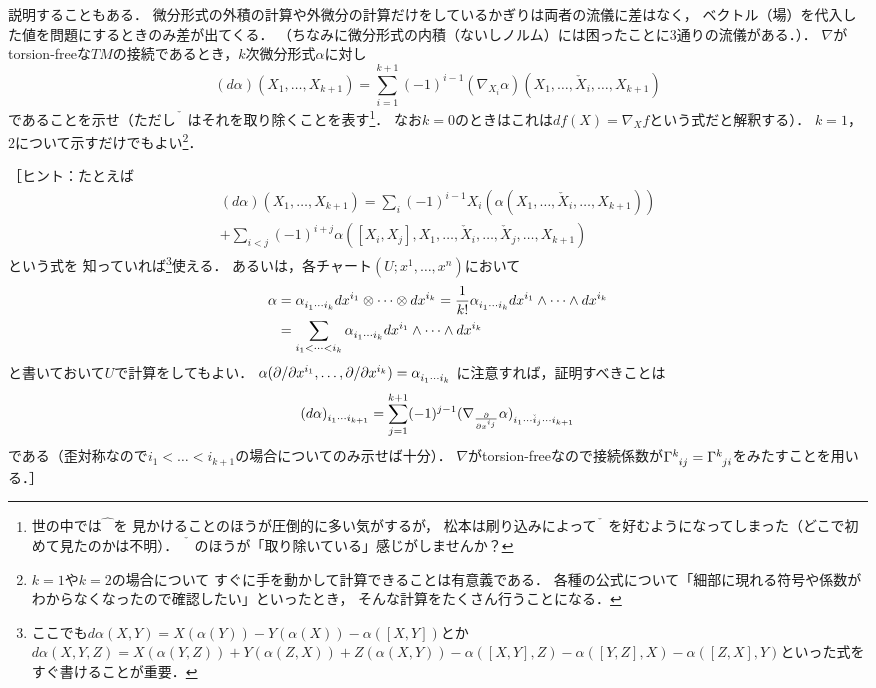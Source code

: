 \documentclass[uplatex,dvipdfmx,fontsize=12pt,jafontsize=11pt,line_length=42zw,number_of_lines=36,hanging_punctuation]{jlreq}
\begin{document}
\begin{problems}
{		説明することもある．
		微分形式の外積の計算や外微分の計算だけをしているかぎりは両者の流儀に差はなく，
		ベクトル（場）を代入した値を問題にするときのみ差が出てくる．
		（ちなみに微分形式の内積（ないしノルム）には困ったことに3通りの流儀がある．）}．
		$\nabla$がtorsion-freeな$TM$の接続であるとき，$k$次微分形式$\alpha$に対し
		\begin{equation}
			(d\alpha)(X_1,\dots,X_{k+1})
			=\sum_{i=1}^{k+1}(-1)^{i-1}(\nabla_{X_i}\alpha)(X_1,\dots,\check{X}_i,\dots,X_{k+1})
		\end{equation}
		であることを示せ（ただし$\check{\phantom{X}}$はそれを取り除くことを表す\footnote{世の中では$\hat{\phantom{X}}$を
		見かけることのほうが圧倒的に多い気がするが，
		松本は刷り込みによって$\check{\phantom{X}}$を好むようになってしまった（どこで初めて見たのかは不明）．
		$\check{\phantom{X}}$のほうが「取り除いている」感じがしませんか？}．
		なお$k=0$のときはこれは$df(X)=\nabla_Xf$という式だと解釈する）．
		$k=1$，$2$について示すだけでもよい\footnote{$k=1$や$k=2$の場合について
		すぐに手を動かして計算できることは有意義である．
		各種の公式について「細部に現れる符号や係数がわからなくなったので確認したい」といったとき，
		そんな計算をたくさん行うことになる．}．

		［ヒント：たとえば
		\begin{multline}
			(d\alpha)(X_1,\dots,X_{k+1})
			=\sum_{i}(-1)^{i-1}X_i(\alpha(X_1,\dots,\check{X}_i,\dots,X_{k+1})) \\
			+\sum_{i<j}(-1)^{i+j}\alpha([X_i,X_j],X_1,\dots,\check{X}_i,\dots,\check{X}_j,\dots,X_{k+1})
		\end{multline}
		という式を
		知っていれば\footnote{ここでも$d\alpha(X,Y)=X(\alpha(Y))-Y(\alpha(X))-\alpha([X,Y])$とか
		$d\alpha(X,Y,Z)=X(\alpha(Y,Z))+Y(\alpha(Z,X))+Z(\alpha(X,Y))
		-\alpha([X,Y],Z)-\alpha([Y,Z],X)-\alpha([Z,X],Y)$といった式をすぐ書けることが重要．}使える．
		あるいは，各チャート$(U;x^1,\dots,x^n)$において
		\begin{equation}
			\begin{split}
				\alpha
				&=\tensor{\alpha}{_{i_1}_{\cdots}_{i_k}}dx^{i_1}\otimes\dots\otimes dx^{i_k}
				=\frac{1}{k!}\tensor{\alpha}{_{i_1}_{\cdots}_{i_k}}dx^{i_1}\wedge\dots\wedge dx^{i_k}\\
				&=\sum_{i_1<\dots<i_k}\tensor{\alpha}{_{i_1}_{\cdots}_{i_k}}dx^{i_1}\wedge\dots\wedge dx^{i_k}
			\end{split}
		\end{equation}
		と書いておいて$U$で計算をしてもよい．
		$\alpha(\partial/\partial x^{i_1},\dots,\partial/\partial x^{i_k})=\tensor{\alpha}{_{i_1}_{\cdots}_{i_k}}$
		に注意すれば，証明すべきことは
		\begin{equation}
			\tensor{(d\alpha)}{_{i_1}_{\cdots}_{i_{k+1}}}
			=\sum_{j=1}^{k+1}(-1)^{j-1}
			\tensor{(\nabla_{\frac{\partial}{\partial x^{i_j}}}\alpha)}{_{i_1}_{\cdots}_{\check{i}_j}_{\cdots}_{i_{k+1}}}
		\end{equation}
		である（歪対称なので$i_1<\dots<i_{k+1}$の場合についてのみ示せば十分）．
		$\nabla$がtorsion-freeなので接続係数が$\tensor{\Gamma}{^k_i_j}=\tensor{\Gamma}{^k_j_i}$をみたすことを用いる．］
\end{problems}
\end{document}
